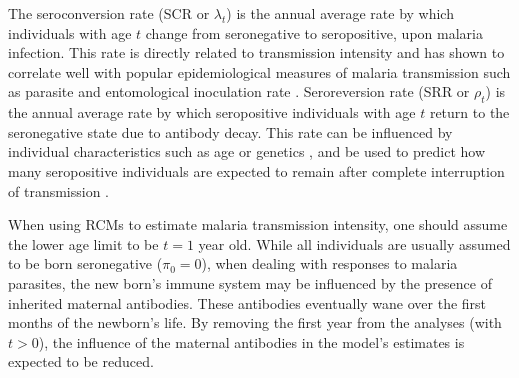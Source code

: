 The seroconversion rate (SCR or $\lambda_t$) is the annual average rate by which individuals with age $t$ change from seronegative to seropositive, upon malaria infection.
This rate is directly related to transmission intensity and has shown to correlate well with popular epidemiological measures of malaria transmission such as parasite and entomological inoculation rate \cite{corran2007serology, drakeley2005estimating, bodker2003relationship}.
Seroreversion rate (SRR or $\rho_t$) is the annual average rate by which seropositive individuals with age $t$ return to the seronegative state due to antibody decay.
This rate can be influenced by individual characteristics such as age or genetics \cite{corran2007serology}, and be used to predict how many seropositive individuals are expected to remain after complete interruption of transmission \cite{corran2007serology}.
%
%

When using RCMs to estimate malaria transmission intensity, one should assume the lower age limit to be $t=1$ year old.
While all individuals are usually assumed to be born seronegative ($\pi_0=0$), when dealing with responses to malaria parasites, the new born's immune system may be influenced by the presence of inherited maternal antibodies.
These antibodies eventually wane over the first months of the newborn's life.
By removing the first year from the analyses (with $t>0$), the influence of the maternal antibodies in the model's estimates is expected to be reduced.


